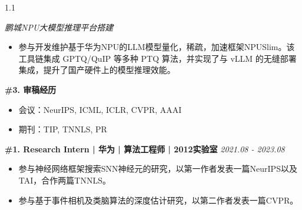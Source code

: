 \documentclass{resume}
\begin{document}
    \begin{itemize}


    \vspace{5pt}
\begin{spacing}{1.1} %
        \item \textit{鹏城NPU大模型推理平台搭建} 

        \vspace{3pt} 
        \begin{itemize}[label=\textbullet, leftmargin=*]
                \item 参与开发维护基于华为NPU的LLM模型量化，稀疏，加速框架NPUSlim。该工具链集成 GPTQ/QuIP 等多种 PTQ 算法，并实现了与 vLLM 的无缝部署集成，提升了国产硬件上的模型推理效能。
            \end{itemize}    
\end{spacing}
\end{itemize}

    \vspace{5pt}
    { \textbf{\#3. 审稿经历}
    \\\vspace{-18pt}}%
    \begin{itemize}
        \item 会议：NeurIPS, ICML, ICLR, CVPR, AAAI
        \item 期刊：TIP, TNNLS, PR
    \end{itemize}
    
\vspace{5pt}



\textbf{\#1. Research Intern | 华为 | 算法工程师 | 2012实验室}
\hfill \textit{2021.08 - 2023.08}\\\vspace{-15pt}%
\begin{itemize}[label=\textbullet, leftmargin=*]
\item 参与神经网络框架搜索SNN神经元的研究，以第一作者发表一篇NeurIPS以及TAI，合作两篇TNNLS。
\item 参与基于事件相机及类脑算法的深度估计研究，以第二作者发表一篇CVPR。
\end{itemize}
\end{document}
